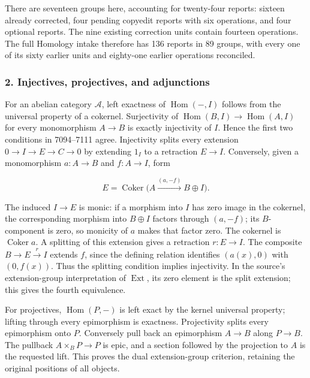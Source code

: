 \documentclass[11pt]{article}
\begin{document}
There are seventeen groups here, accounting for twenty-four reports: sixteen already corrected, four pending copyedit reports with six operations, and four optional reports. The nine existing correction units contain fourteen operations. The full Homology intake therefore has 136 reports in 89 groups, with every one of its sixty earlier units and eighty-one earlier operations reconciled.

\subsubsection{2. Injectives, projectives, and adjunctions}\label{injectives-projectives-and-adjunctions}

For an abelian category \(\mathcal A\), left exactness of \(\operatorname{Hom}(-,I)\) follows from the universal property of a cokernel. Surjectivity of \(\operatorname{Hom}(B,I)\to\operatorname{Hom}(A,I)\) for every monomorphism \(A\to B\) is exactly injectivity of \(I\). Hence the first two conditions in 7094--7111 agree. Injectivity splits every extension \(0\to I\to E\to C\to0\) by extending \(1_I\) to a retraction \(E\to I\). Conversely, given a monomorphism \(a:A\to B\) and \(f:A\to I\), form

\[
E=\operatorname{Coker}\bigl(A\xrightarrow{(a,-f)}B\oplus I\bigr).
\]

The induced \(I\to E\) is monic: if a morphism into \(I\) has zero image in the cokernel, the corresponding morphism into \(B\oplus I\) factors through \((a,-f)\); its \(B\)-component is zero, so monicity of \(a\) makes that factor zero. The cokernel is \(\operatorname{Coker}a\). A splitting of this extension gives a retraction \(r:E\to I\). The composite \(B\to E\xrightarrow r I\) extends \(f\), since the defining relation identifies \((a(x),0)\) with \((0,f(x))\). Thus the splitting condition implies injectivity. In the source's extension-group interpretation of \(\operatorname{Ext}\), its zero element is the split extension; this gives the fourth equivalence.

For projectives, \(\operatorname{Hom}(P,-)\) is left exact by the kernel universal property; lifting through every epimorphism is exactness. Projectivity splits every epimorphism onto \(P\). Conversely pull back an epimorphism \(A\to B\) along \(P\to B\). The pullback \(A\times_B P\to P\) is epic, and a section followed by the projection to \(A\) is the requested lift. This proves the dual extension-group criterion, retaining the original positions of all objects.
\end{document}
